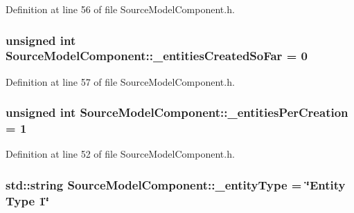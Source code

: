 Definition at line 56 of file Source\-Model\-Component.\-h.

\hypertarget{class_source_model_component_af1f4fb38d2c0c4ac08235d7aec131bc9}{
\subsubsection[{\-\_\-entities\-Created\-So\-Far}]{\setlength{\rightskip}{0pt plus 5cm}unsigned int Source\-Model\-Component\-::\-\_\-entities\-Created\-So\-Far = 0\hspace{0.3cm}{\ttfamily [protected]}}}\label{class_source_model_component_af1f4fb38d2c0c4ac08235d7aec131bc9}


Definition at line 57 of file Source\-Model\-Component.\-h.

\hypertarget{class_source_model_component_a68b0576903281a4716eb3ea0281dd133}{
\subsubsection[{\-\_\-entities\-Per\-Creation}]{\setlength{\rightskip}{0pt plus 5cm}unsigned int Source\-Model\-Component\-::\-\_\-entities\-Per\-Creation = 1\hspace{0.3cm}{\ttfamily [protected]}}}\label{class_source_model_component_a68b0576903281a4716eb3ea0281dd133}


Definition at line 52 of file Source\-Model\-Component.\-h.

\hypertarget{class_source_model_component_ad001e8ae30c828916f271ac72c7817d1}{
\subsubsection[{\-\_\-entity\-Type}]{\setlength{\rightskip}{0pt plus 5cm}std\-::string Source\-Model\-Component\-::\-\_\-entity\-Type = \char`\"{}Entity Type 1\char`\"{}\hspace{0.3cm}{\ttfamily [protected]}}}\label{class_source_model_component_ad001e8ae30c828916f271ac72c7817d1}



